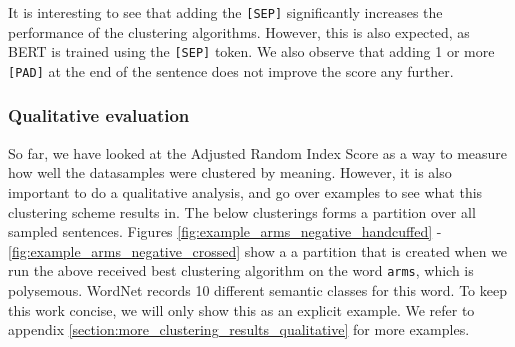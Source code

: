 \documentclass[a4paper,12pt,twoside,openright]{report}
\begin{document}
It is interesting to see that adding the \Verb#[SEP]# significantly increases the performance of the clustering algorithms.
However, this is also expected, as BERT is trained using the \Verb#[SEP]# token.
We also observe that adding 1 or more \Verb#[PAD]# at the end of the sentence does not improve the score any further. \\

\subsubsection{Qualitative evaluation}

So far, we have looked at the Adjusted Random Index Score as a way to measure how well the datasamples were clustered by meaning.
However, it is also important to do a qualitative analysis, and go over examples to see what this clustering scheme results in.
The below clusterings forms a partition over all sampled sentences.
Figures \ref{fig:example_arms_negative_handcuffed} - \ref{fig:example_arms_negative_crossed} show a a partition that is created when we run the above received best clustering algorithm on the word \Verb#arms#, which is polysemous. 
WordNet records 10 different semantic classes for this word.
To keep this work concise, we will only show this as an explicit example. 
We refer to appendix \ref{section:more_clustering_results_qualitative} for  more examples.
\\
\end{document}
